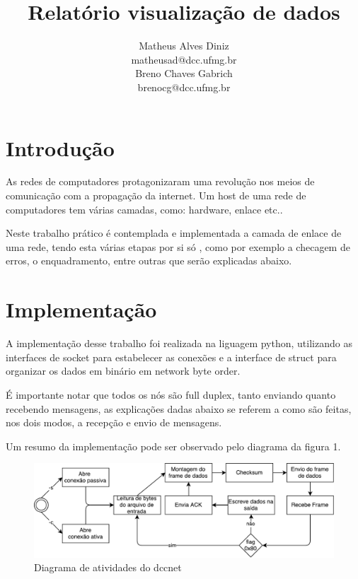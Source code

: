 \documentclass[a4paper,10pt]{article}
\begin{document}
\title{Relatório visualização de dados}
\author{Matheus Alves Diniz\\matheusad@dcc.ufmg.br \\
Breno Chaves Gabrich\\brenocg@dcc.ufmg.br}
\maketitle
\section{Introdução}
  As redes de computadores protagonizaram uma revolução nos meios de
  comunicação com a propagação da internet. Um host de uma rede de
  computadores tem várias camadas, como: hardware, enlace etc..

  Neste trabalho prático é contemplada e implementada a camada de enlace de
  uma rede, tendo esta várias etapas por si só , como por exemplo a checagem
  de erros, o enquadramento, entre outras que serão explicadas abaixo.

\section{Implementação}

  A implementação desse trabalho foi realizada na liguagem python,
  utilizando as interfaces de socket para estabelecer as conexões e a
  interface de struct para organizar os dados em binário em
  network byte order.

  É importante notar que todos os nós são full duplex, tanto enviando quanto
  recebendo mensagens, as explicações dadas abaixo
  se referem a como são feitas, nos dois modos, a recepção e envio de
  mensagens.

  Um resumo da implementação pode ser observado pelo diagrama da figura 1.

  \begin{figure}
  \includegraphics[scale=0.5]{diag.pdf}
    \caption{Diagrama de atividades do dccnet}
  \end{figure}
\end{document}
